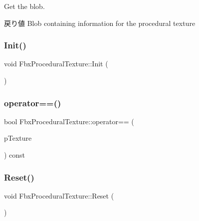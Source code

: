 Get the blob. \begin{DoxyReturn}{戻り値}
Blob containing information for the procedural texture 
\end{DoxyReturn}
\mbox{\label{class_fbx_procedural_texture_aea1c75e2dcb3caea85e9a231c9e94a75}} 
\subsubsection{\texorpdfstring{Init()}{Init()}}
{\footnotesize\ttfamily void Fbx\+Procedural\+Texture\+::\+Init (\begin{DoxyParamCaption}{ }\end{DoxyParamCaption})\hspace{0.3cm}{\ttfamily [protected]}}

\mbox{\label{class_fbx_procedural_texture_a0687270beaf7354bec0e230bd85a61b7}} 
\subsubsection{\texorpdfstring{operator==()}{operator==()}}
{\footnotesize\ttfamily bool Fbx\+Procedural\+Texture\+::operator== (\begin{DoxyParamCaption}\item[{\hyperlink{class_fbx_procedural_texture}{Fbx\+Procedural\+Texture} const \&}]{p\+Texture }\end{DoxyParamCaption}) const}

\mbox{\label{class_fbx_procedural_texture_ad98e91a632bfbd9f29ee537cbe4ff180}} 
\subsubsection{\texorpdfstring{Reset()}{Reset()}}
{\footnotesize\ttfamily void Fbx\+Procedural\+Texture\+::\+Reset (\begin{DoxyParamCaption}{ }\end{DoxyParamCaption})\hspace{0.3cm}{\ttfamily [virtual]}}

